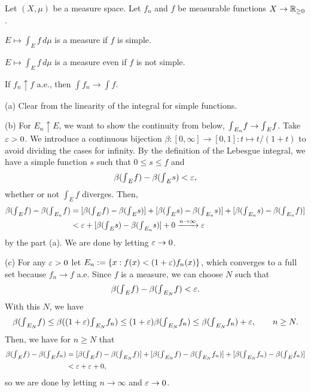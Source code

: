 \documentclass{../../large}
\begin{document}
\begin{prb}
Let $(X,\mu)$ be a measure space.
Let $f_n$ and $f$ be measurable functions $X\to\mathbb{R}_{\ge0}$.
\begin{parts}
\item $E\mapsto\int_Ef\,d\mu$ is a measure if $f$ is simple.
\item $E\mapsto\int_Ef\,d\mu$ is a measure even if $f$ is not simple.
\item If $f_n\uparrow f$ a.e., then $\int f_n\to\int f$.
\end{parts}
\end{prb}
\begin{pf}
(a)
Clear from the linearity of the integral for simple functions.

(b)
For $E_n\uparrow E$, we want to show the continuity from below, ${\textstyle\int}_{E_n}f\to{\textstyle\int}_Ef$.
Take $\varepsilon>0$.
We introduce a continuous bijection $\beta:[0,\infty]\to[0,1]:t\mapsto t/(1+t)$ to avoid dividing the cases for infinity.
By the definition of the Lebesgue integral, we have a simple function $s$ such that $0\le s\le f$ and
\[\beta({\textstyle\int}_Ef)-\beta({\textstyle\int}_Es)<\varepsilon,\]
whether or not $\int_Ef$ diverges.
Then,
\begin{align*}
\beta({\textstyle\int}_Ef)-\beta({\textstyle\int}_{E_n}f)
&=[\beta({\textstyle\int}_Ef)-\beta({\textstyle\int}_Es)]
+[\beta({\textstyle\int}_Es)-\beta({\textstyle\int}_{E_n}s)]
+[\beta({\textstyle\int}_{E_n}s)-\beta({\textstyle\int}_{E_n}f)]\\
&<\varepsilon+[\beta({\textstyle\int}_Es)-\beta({\textstyle\int}_{E_n}s)]+0
\xrightarrow{n\to\infty}\varepsilon
\end{align*}
by the part (a).
We are done by letting $\varepsilon\to0$.

(c)
For any $\varepsilon>0$ let $E_n:=\{x:f(x)<(1+\varepsilon)f_n(x)\}$, which converges to a full set because $f_n\to f$ a.e.
Since $f$ is a measure, we can choose $N$ such that
\[\beta({\textstyle\int}_Ef)-\beta({\textstyle\int}_{E_N}f)<\varepsilon.\]
With this $N$, we have
\[\beta({\textstyle\int}_{E_N}f)
\le\beta((1+\varepsilon){\textstyle\int}_{E_N}f_n)
\le(1+\varepsilon)\beta({\textstyle\int}_{E_N}f_n)
\le\beta({\textstyle\int}_{E_N}f_n)+\varepsilon,\qquad n\ge N.\]
Then, we have for $n\ge N$ that
\begin{align*}
\beta({\textstyle\int}_Ef)-\beta({\textstyle\int}_Ef_n)
&=[\beta({\textstyle\int}_Ef)-\beta({\textstyle\int}_{E_N}f)]+[\beta({\textstyle\int}_{E_N}f)-\beta({\textstyle\int}_{E_N}f_n)]+[\beta({\textstyle\int}_{E_N}f_n)-\beta({\textstyle\int}_{E}f_n)]\\
&<\varepsilon+\varepsilon+0,
\end{align*}
so we are done by letting $n\to\infty$ and $\varepsilon\to0$.
\end{pf}
\end{document}
